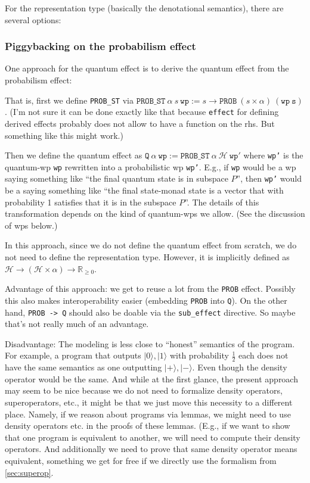 \documentclass[a4paper]{article}
\newcommand\setR{\mathbb R}
\newcommand\Rpos{\setR_{\geq0}}
\newcommand\calH{\mathcal H}
\newcommand\ket[1]{\lvert#1\rangle}
\begin{document}
For the representation type (basically the denotational semantics), there are several options:

\subsubsection{Piggybacking on the probabilism effect}
\label{sec:piggy.prob}
  
One approach for the quantum effect is to derive the quantum effect
from the probabilism effect:

That is, first we define \texttt{PROB\_ST} via
$\mathtt{PROB\_ST}\ \alpha\ s\ \mathtt{wp} := s \to \mathtt{PROB}\
(s\times \alpha)\ \mathtt{(wp\ s)}$. (I'm not sure it can be done exactly like that
because \texttt{effect} for defining derived effects probably does not
allow to have a function on the rhs. But something like this might
work.)

Then we define the quantum effect as
$\mathtt{Q}\ \alpha\ \mathtt{wp} := \mathtt{PROB\_ST}\ \alpha\ \calH\
\mathtt{wp'}$ where \texttt{wp'} is the quantum-wp \texttt{wp}
rewritten into a probabilistic wp \texttt{wp'}.  E.g., if \texttt{wp}
would be a wp saying something like ``the final quantum state is in
subspace $P$'', then \texttt{wp'} would be a saying something like ``the final state-monad state is a vector that with probability 1 satisfies that it is in the subspace $P$''. The details of this transformation depends on the kind of quantum-wps we allow. (See the discussion of wps below.)

In this approach, since we do not define the quantum effect from scratch, we do not need to define the representation type.
However, it is implicitly defined as $\calH\to(\calH\times\alpha)\to\Rpos$.

Advantage of this approach: we get to reuse a lot from the \texttt{PROB} effect. Possibly this also makes interoperability easier (embedding \texttt{PROB} into \texttt{Q}). On the other hand, \texttt{PROB -> Q} should also be doable via the \texttt{sub\_effect} directive. So maybe that's not really much of an advantage. 

Disadvantage: The modeling is less close to ``honest'' semantics of the program.
For example, a program that outputs $\ket0,\ket1$ with probability $\frac12$ each does not have the same semantics as one outputting $\ket+,\ket-$.
Even though the density operator would be the same.
And while at the first glance, the present approach may seem to be nice because we do not need to formalize density operators, superoperators, etc., it might be that we just move this necessity to a different place.
Namely, if we reason about programs via lemmas, we might need to use density operators etc. in the proofs of these lemmas. (E.g., if we want to show that one program is equivalent to another, we will need to compute their density operators.
And additionally we need to prove that same density operator means equivalent, something we get for free if we directly use the formalism from \autoref{sec:superop}.
\end{document}
